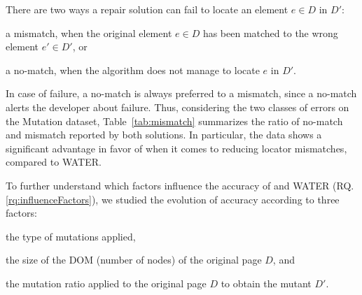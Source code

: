 There are two ways a repair solution can fail to locate an element $e \in D$ in $D'$: 
\begin{inparaenum}
    \item a \textsf{mismatch}, when the original element $e \in D$ has been matched to the wrong element $e' \in D'$, or
    \item a \textsf{no-match}, when the algorithm does not manage to locate $e$ in $D'$. 
\end{inparaenum}
In case of failure, a \textsf{no-match} is always preferred to a \textsf{mismatch}, since a \textsf{no-match} alerts the developer about failure.
Thus, considering the two classes of errors on the {\sc Mutation} dataset, Table~\ref{tab:mismatch} summarizes the ratio of \textsf{no-match} and \textsf{mismatch} reported by both solutions.
In particular, the data shows a significant advantage in favor of \erratum when it comes to reducing locator mismatches, compared to WATER.

\begin{table}[H]
    \caption{Errors distribution of \erratum{} and WATER on the \textsc{Mutation} dataset.}\label{tab:mismatch}
    \centering
\end{table}

To further understand which factors influence the accuracy of \erratum and WATER (RQ.\ref{rq:influenceFactors}), we studied the evolution of accuracy according to three factors:
\begin{inparaenum}
    \item the type of mutations applied,
    \item the size of the DOM (number of nodes) of the original page $D$, and
    \item the mutation ratio applied to the original page $D$ to obtain the mutant $D'$.
\end{inparaenum}

